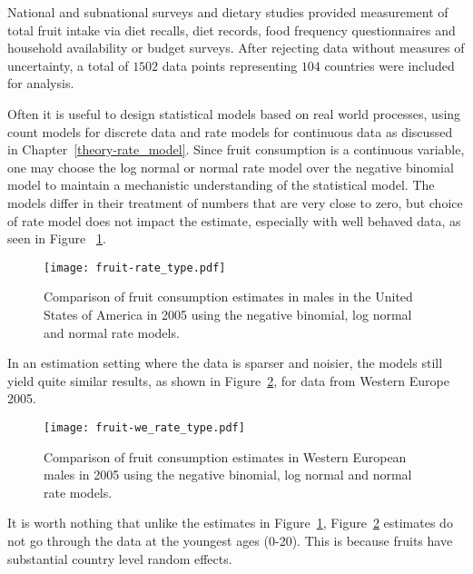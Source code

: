 National and subnational surveys and dietary studies provided
measurement of total fruit intake via diet recalls, diet records, food
frequency questionnaires and household availability or budget surveys.
After rejecting data without measures of uncertainty, a total of $1502$
data points representing $104$ countries were included for analysis.

Often it is useful to design statistical models based on real world
processes, using count models for discrete data and rate models for
continuous data as discussed in Chapter~\ref{theory-rate_model}.
Since fruit consumption is a continuous variable, one may choose the
log normal or normal rate model over the negative binomial model to
maintain a mechanistic understanding of the statistical model.  The
models differ in their treatment of numbers that are very close to
zero, but choice of rate model does not impact the estimate,
especially with well behaved data, as seen in Figure
~\ref{fig:app-fruit rate type}.

    \begin{figure}[h]
        \begin{center}
            \texttt{[image: fruit-rate\_type.pdf]}
            \caption{Comparison of fruit consumption estimates in
              males in the United States of America in 2005 using the
              negative binomial, log normal and normal rate models.}
            \label{fig:app-fruit rate type}
        \end{center}
    \end{figure}

In an estimation setting where the data is sparser and noisier, the
models still yield quite similar results, as shown in Figure~\ref{fig:app-fruit europe},
for data from Western Europe 2005.

    \begin{figure}[h]
        \begin{center}
            \texttt{[image: fruit-we\_rate\_type.pdf]}
            \caption{Comparison of fruit consumption estimates in
              Western European males in 2005 using the
              negative binomial, log normal and normal rate models.}
            \label{fig:app-fruit europe}
        \end{center}
    \end{figure}

It is worth nothing that unlike the estimates in Figure~\ref{fig:app-fruit rate type}, 
Figure~\ref{fig:app-fruit europe} estimates do not go through the data at the youngest
ages (0-20).  This is because fruits have substantial country level random effects.

